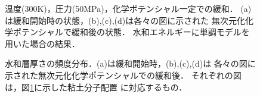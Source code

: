 \begin{figure}[h]
	\begin{center}
	\end{center}
	\caption{
		温度(300K)，圧力(50MPa)，化学ポテンシャル一定での緩和．
		(a)は緩和開始時の状態，(b),(c),(d)は各々の図に示された
		無次元化化学ポテンシャルで緩和後の状態．
		水和エネルギーに単調モデルを用いた場合の結果．
	} 
	\label{fig:fig8}
\end{figure}
\begin{figure}[h]
	\begin{center}
	\end{center}
	\caption{
		水和層厚さの頻度分布．(a)は緩和開始時，(b),(c),(d)は
		各々の図に示された無次元化化学ポテンシャルでの緩和後．
		それぞれの図は，図\ref{fig:fig8}に示した粘土分子配置
		に対応するもの．
	} 
	\label{fig:fig9}
\end{figure}

